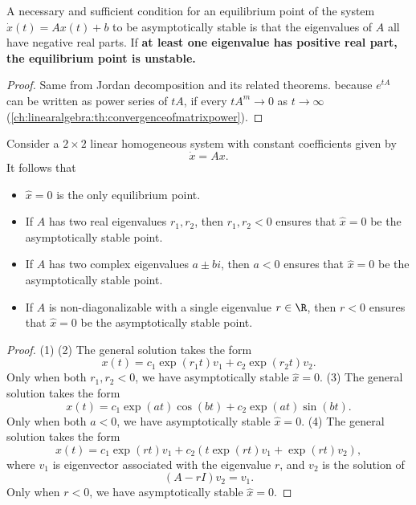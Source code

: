 \begin{refsection}
\begin{theorem}
\cite[157]{luenberger1979introduction}A necessary and sufficient condition for an equilibrium point of the system $\dot{x}(t) = Ax(t) + b$ to be asymptotically stable is that the eigenvalues of $A$ all have negative real parts. If \textbf{at least one eigenvalue has positive real part, the equilibrium point is unstable.}
\end{theorem}
\begin{proof}
Same from Jordan decomposition and its related theorems.
because $e^{tA}$ can be written as power series of $tA$, if every ${tA}^m \to 0$ as $t\to \infty$ (\autoref{ch:linearalgebra:th:convergenceofmatrixpower}). 	
\end{proof}

\begin{theorem}
Consider a $2\times 2$ linear homogeneous system with constant coefficients given by
$$\dot{x} = Ax.$$
It follows that
\begin{itemize}
	\item $\hat{x} = 0$ is the only equilibrium point.
	\item If $A$ has two real eigenvalues $r_1,r_2$, then $r_1,r_2<0$ ensures that $\hat{x} = 0$ be the asymptotically stable point.
	\item If $A$ has two complex eigenvalues $a\pm bi$, then $a<0$ ensures that $\hat{x} = 0$ be the asymptotically stable point.
	\item If $A$ is non-diagonalizable with a single eigenvalue $r\in \R$, then $r<0$ ensures that $\hat{x} = 0$ be the asymptotically stable point.
\end{itemize}	
\end{theorem}
\begin{proof}
(1)  (2) The general solution takes the form
$$x(t) = c_1\exp(r_1t)v_1 + c_2\exp(r_2t)v_2.$$
Only when both $r_1,r_2<0$, we have asymptotically stable $\hat{x}= 0$.
(3) The general solution takes the form
$$x(t) = c_1\exp(at)\cos(bt) + c_2\exp(at)\sin(bt).$$
Only when both $a<0$, we have asymptotically stable $\hat{x}= 0$.
(4) The general solution takes the form
$$x(t) = c_1\exp(rt)v_1 + c_2(t\exp(rt)v_1 + \exp(rt)v_2 ),$$
where $v_1$ is eigenvector associated with the eigenvalue $r$, and $v_2$ is the solution of 
$$(A - rI)v_2 = v_1.$$
Only when $r<0$, we have asymptotically stable $\hat{x}= 0$.
\end{proof}




\end{refsection}
